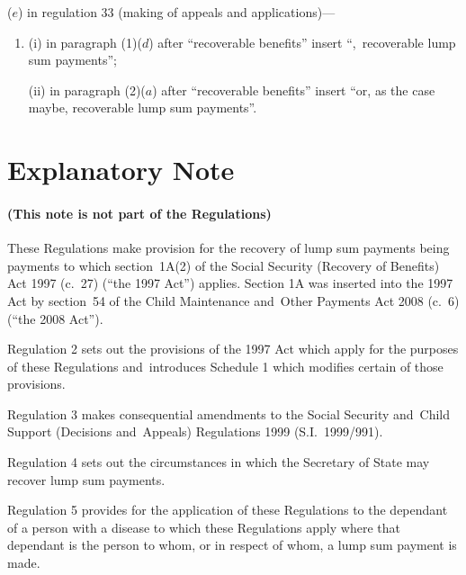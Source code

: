 \documentclass[12pt,a4paper]{article}
\begin{document}
\begin{enumerate}

($e$) in regulation 33 (making of appeals and applications)—
\begin{enumerate}\item[]
(i) in paragraph (1)($d$)  after “recoverable benefits” insert “,~recoverable lump sum payments”;

(ii) in paragraph (2)($a$)  after “recoverable benefits” insert “or, as the case maybe, recoverable lump sum payments”.
\end{enumerate}
\end{enumerate}


\part{Explanatory Note}

\renewcommand\parthead{— Explanatory Note}

\subsection*{(This note is not part of the Regulations)}

These Regulations make provision for the recovery of lump sum payments being payments to which section~1A(2) of the Social Security (Recovery of Benefits) Act 1997 (c.~27) (“the 1997 Act”) applies. Section 1A was inserted into the 1997 Act by section~54 of the Child Maintenance and~Other Payments Act 2008 (c.~6) (“the 2008 Act”).

Regulation 2 sets out the provisions of the 1997 Act which apply for the purposes of these Regulations and~introduces Schedule 1 which modifies certain of those provisions.

Regulation 3 makes consequential amendments to the Social Security and~Child Support (Decisions and~Appeals) Regulations 1999 (S.I.~1999/991).

Regulation 4 sets out the circumstances in which the Secretary of State may recover lump sum payments.

Regulation 5 provides for the application of these Regulations to the dependant of a person with a disease to which these Regulations apply where that dependant is the person to whom, or in respect of whom, a lump sum payment is made.
\end{document}
